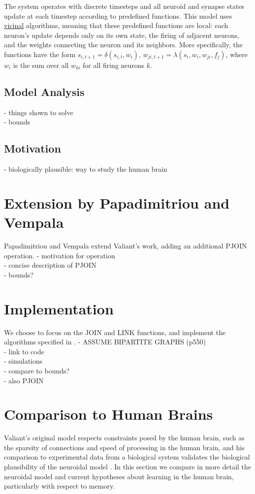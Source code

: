 \documentclass[letterpaper, 12pt]{article}
\begin{document}
The system operates with discrete timesteps and all neuroid and synapse states update at each timestep according to predefined functions. This model uses \underline{vicinal} algorithms, meaning that these predefined functions are local: each neuron's update depends only on its own state, the firing of adjacent neurons, and the weights connecting the neuron and its neighbors. More specifically, the functions have the form $s_{i,t+1}=\delta(s_{i,t},w_i)$, $w_{ji,t+1}=\lambda(s_i,w_i,w_{ji},f_j)$, where $w_i$ is the sum over all $w_{ki}$ for all firing neurons $k$.

\subsection{Model Analysis}
- things shown to solve\\
- bounds\\
\subsection*{Motivation}
- biologically plausible: way to study the human brain


\section{Extension by Papadimitriou and Vempala}
Papadimitriou and Vempala \cite{papadimitriou_cortical_2015} extend Valiant's work, adding an additional PJOIN operation.
- motivation for operation\\
- concise description of PJOIN\\
- bounds?\\

\section{Implementation}
We choose to focus on the JOIN and LINK functions, and implement the algorithms specified in \cite{valiant_memorization_2005}.
- ASSUME BIPARTITE GRAPHS (p550)\\
- link to code\\
- simulations\\
- compare to bounds?\\

- also PJOIN

\section{Comparison to Human Brains}
Valiant's original model respects constraints posed by the human brain, such as the sparsity of connections and speed of processing in the human brain, and his comparison to experimental data from a biological system validates the biological plausibility of the neuroidal model \cite{valiant_quantitative_2006}. In this section we compare in more detail the neuroidal model and current hypotheses about learning in the human brain, particularly with respect to memory.
\end{document}

